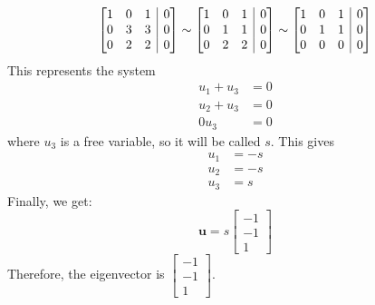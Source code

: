 \documentclass[11pt]{article}
\makeatletter
\newenvironment{amatrix}[1]{%
    \left[\begin{array}{@{}*{#1}{c}|c@{}}
}{%
    \end{array}\right]
}
\makeatother
\begin{document}
\begin{enumerate}[label=\textbf{\arabic*.}]
{\begin{enumerate}[label=\textbf{(\alph*)}]
{\begin{gather*}
\begin{amatrix}{3}
                            1 & 0 & 1 & 0 \\
                            0 & 3 & 3 & 0 \\
                            0 & 2 & 2 & 0
                        \end{amatrix}
                        \sim
                        \begin{amatrix}{3}
                            1 & 0 & 1 & 0 \\
                            0 & 1 & 1 & 0 \\
                            0 & 2 & 2 & 0
                        \end{amatrix}
                        \sim
                        \begin{amatrix}{3}
                            1 & 0 & 1 & 0 \\
                            0 & 1 & 1 & 0 \\
                            0 & 0 & 0 & 0
                        \end{amatrix}
                    \end{gather*}
                    This represents the system
                    \begin{align*}
                            u_1+u_3&=0 \\
                            u_2+u_3&=0 \\
                            0u_3&=0
                    \end{align*}
                    where \(u_3\) is a free variable, so it will be called \(s\). This gives
                    \begin{align*}
                        u_1&=-s \\
                        u_2&=-s \\
                        u_3&=s
                    \end{align*}
                    Finally, we get:
                    \begin{equation*}
                        \mathbf{u}=s
                        \begin{bmatrix}
                            -1 \\ -1 \\ 1
                        \end{bmatrix}
                    \end{equation*} 
                    Therefore, the eigenvector is \(\begin{bmatrix}-1 \\ -1 \\ 1\end{bmatrix}\).
                }
            \end{enumerate}
        }
    \end{enumerate}
\end{document}
